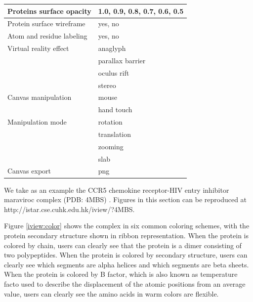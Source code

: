 \begin{table}
\begin{tabular}{ll}
\hline
 Proteins surface opacity & 1.0, 0.9, 0.8, 0.7, 0.6, 0.5\\
\hline
Protein surface wireframe & yes, no\\
\hline
Atom and residue labeling & yes, no\\
\hline
   Virtual reality effect & anaglyph\\
                          & parallax barrier\\
                          & oculus rift\\
                          & stereo\\
\hline
      Canvas manipulation & mouse\\
                          & hand touch\\
\hline
        Manipulation mode & rotation\\
                          & translation\\
                          & zooming\\
                          & slab\\
\hline
            Canvas export & png\\
\hline
\end{tabular}
\end{table}

We take as an example the CCR5 chemokine receptor-HIV entry inhibitor maraviroc complex (PDB: 4MBS) \citep{1348}. Figures in this section can be reproduced at http://istar.cse.cuhk.edu.hk/iview/?4MBS.

Figure \ref{iview:color} shows the complex in six common coloring schemes, with the protein secondary structure shown in ribbon representation. When the protein is colored by chain, users can clearly see that the protein is a dimer consisting of two polypeptides. When the protein is colored by secondary structure, users can clearly see which segments are alpha helices and which segments are beta sheets. When the protein is colored by B factor, which is also known as temperature facto used to describe the displacement of the atomic positions from an average value, users can clearly see the amino acids in warm colors are flexible.

